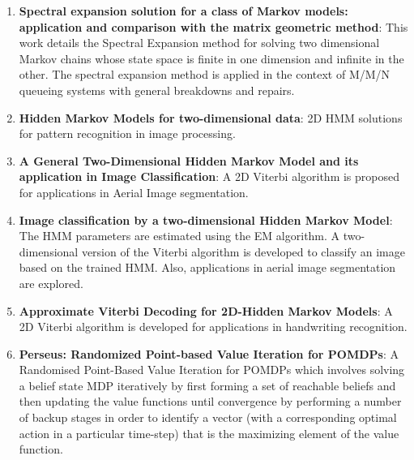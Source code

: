 \documentclass[12pt, draftcls, onecolumn]{IEEEtran}
\begin{document}
\begin{enumerate}
    \item \textbf{Spectral expansion solution for a class of Markov models: application and comparison with the matrix geometric method}: This work details the Spectral Expansion method for solving two dimensional Markov chains whose state space is finite in one dimension and infinite in the other. The spectral expansion method is applied in the context of M/M/N queueing systems with general breakdowns and repairs.
    \item \textbf{Hidden Markov Models for two-dimensional data}: 2D HMM solutions for pattern recognition in image processing.
    \item \textbf{A General Two-Dimensional Hidden Markov Model and its application in Image Classification}: A 2D Viterbi algorithm is proposed for applications in Aerial Image segmentation.
    \item \textbf{Image classification by a two-dimensional Hidden Markov Model}: The HMM parameters are estimated using the EM algorithm. A two-dimensional version of the Viterbi algorithm is developed to classify an image based on the trained HMM. Also, applications in aerial image segmentation are explored.
    \item \textbf{Approximate Viterbi Decoding for 2D-Hidden Markov Models}: A 2D Viterbi algorithm is developed for applications in handwriting recognition.
    \item \textbf{Perseus: Randomized Point-based Value Iteration for POMDPs}: A Randomised Point-Based Value Iteration for POMDPs which involves solving a belief state MDP iteratively by first forming a set of reachable beliefs and then updating the value functions until convergence by performing a number of backup stages in order to identify a vector (with a corresponding optimal action in a particular time-step) that is the maximizing element of the value function.\newline

\end{enumerate}
\end{document}
